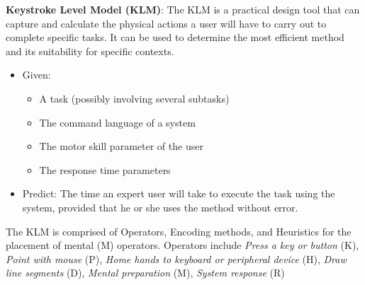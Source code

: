 \textbf{Keystroke Level Model (KLM)}: The KLM is a practical design tool that can capture and calculate the physical actions a user will have to carry out to complete specific tasks. It can be used to determine the most efficient method and its suitability for specific contexts. 
\begin{itemize}
\item Given:
\begin{itemize}
\item A task (possibly involving several subtasks)
\item The command language of a system
\item The motor skill parameter of the user
\item The response time parameters
\end{itemize}
\item Predict: The time an expert user will take to execute the task using the system, provided that he or she uses the method without error.
\end{itemize}
The KLM is comprised of Operators, Encoding methods, and Heuristics for the placement of mental (M) operators. Operators include \textit{Press a key or button} (K), \textit{Point with mouse} (P), \textit{Home hands to keyboard or peripheral device} (H), \textit{Draw line segments} (D), \textit{Mental preparation} (M), \textit{System response} (R)